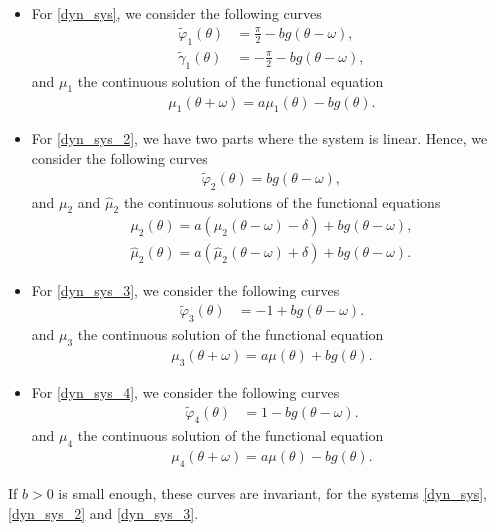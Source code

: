 \documentclass[12pt]{article}
\theoremstyle{plain}
\theoremstyle{remark}
\theoremstyle{definition}
\begin{document}
\begin{itemize}
    \item For \eqref{dyn_sys}, we consider the following curves
    \begin{align*}
        \tilde\varphi_1(\theta) &= \frac{\pi}{2} - b g(\theta-\omega),\\
        \tilde\gamma_1(\theta) &= -\frac{\pi}{2} - b g(\theta-\omega),
    \end{align*}
    and $\mu_1$ the continuous solution of the functional equation
    \begin{align*}
        \mu_1(\theta+\omega) = a\mu_1(\theta) - b g(\theta).
    \end{align*}
    \item For \eqref{dyn_sys_2}, we have two parts where the system is linear. Hence, we consider the following curves
    \begin{align*}
        \tilde\varphi_2(\theta) = b g(\theta-\omega),
    \end{align*}
    and $\mu_2$ and $\hat\mu_2$ the continuous solutions of the functional equations
    \begin{align*}
        \mu_2(\theta) = a(\mu_2(\theta-\omega)-\delta) +b g(\theta-\omega),\\
        \hat\mu_2(\theta) = a(\hat\mu_2(\theta-\omega)+\delta) +b g(\theta-\omega).
    \end{align*}
    \item For \eqref{dyn_sys_3}, we consider the following curves
    \begin{align*}
        \tilde\varphi_3(\theta) &= -1 + b g(\theta-\omega).
    \end{align*}
    and $\mu_3$ the continuous solution of the functional equation
    \begin{align*}
        \mu_3(\theta+\omega) = a\mu(\theta) + b g(\theta).
    \end{align*}
    \item For \eqref{dyn_sys_4}, we consider the following curves
    \begin{align*}
        \tilde\varphi_4(\theta) &= 1 - b g(\theta-\omega).
    \end{align*}
    and $\mu_4$ the continuous solution of the functional equation
    \begin{align}\label{mu_fun}
        \mu_4(\theta+\omega) = a\mu(\theta) - b g(\theta).
    \end{align}
\end{itemize}
If $b>0$ is small enough, these curves are invariant, for the systems \eqref{dyn_sys}, \eqref{dyn_sys_2} and \eqref{dyn_sys_3}.
\end{document}
